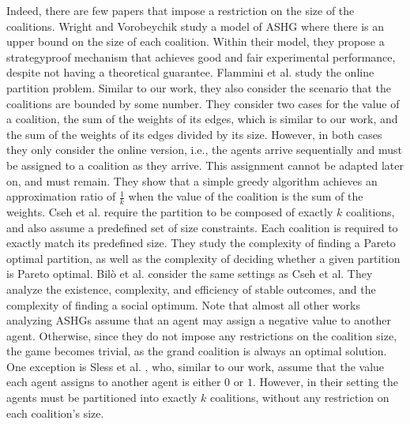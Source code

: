 \documentclass[sigconf,anonymous]{aamas}
\begin{document}
Indeed, there are few papers that impose a restriction on the size of the coalitions. 
Wright and Vorobeychik \cite{wright2015mechanism} study a model of ASHG where there is an upper bound on the size of
each coalition. Within their model, they propose a strategyproof
mechanism that achieves good and fair experimental
performance, despite not having a theoretical guarantee.
Flammini et al. \cite{flammini2021online} study the online partition problem. Similar to our work, they also consider the scenario that the coalitions are bounded by some number. They consider two cases for the value of a coalition, the sum of the weights of its edges, which is similar to our work, and the sum of the weights of its edges divided by its size. However, in both cases they only consider the online version, i.e., the agents arrive sequentially and must be assigned to a coalition as they arrive. This assignment cannot be adapted later on, and must remain. They show that a simple greedy algorithm achieves an approximation ratio of $\frac{1}{k}$ when the value of the coalition is the sum of the weights. 
Cseh et al. \cite{cseh2019pareto} require the partition to be composed of exactly $k$ coalitions, and also assume a predefined set of size constraints. Each coalition is required to exactly match its predefined size. They study the complexity of finding a Pareto optimal partition, as well as the complexity of deciding whether a given partition is Pareto optimal.
Bilò et al. \cite{bilo2022hedonic} consider the same settings as Cseh et al.
They analyze the existence, complexity, and efficiency of stable outcomes, and the complexity of finding a social optimum.
%
Note that almost all other works analyzing ASHGs assume that an agent may assign a negative value to another agent. Otherwise, since they do not impose any restrictions on the coalition size, the game becomes trivial, as the grand coalition is always an optimal solution. One exception is Sless et al. , who, similar to our work, assume that the value each agent assigns to another agent is either $0$ or $1$. However, in their setting the agents must be partitioned into exactly $k$ coalitions, without any restriction on each coalition's size.
\end{document}
